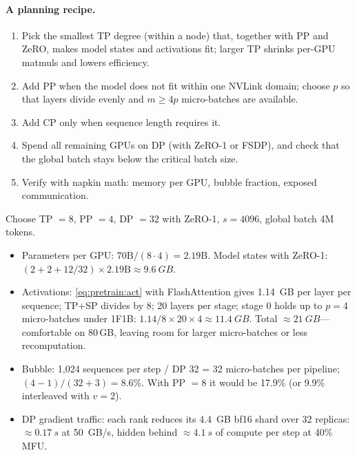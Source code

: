 \paragraph{A planning recipe.}
\begin{enumerate}
\item Pick the smallest TP degree (within a node) that, together with PP and ZeRO, makes model
  states and activations fit; larger TP shrinks per-GPU matmuls and lowers efficiency.
\item Add PP when the model does not fit within one NVLink domain; choose $p$ so that layers
  divide evenly and $m\ge4p$ micro-batches are available.
\item Add CP only when sequence length requires it.
\item Spend all remaining GPUs on DP (with ZeRO-1 or FSDP), and check that the global batch
  stays below the critical batch size.
\item Verify with napkin math: memory per GPU, bubble fraction, exposed communication.
\end{enumerate}

\begin{napkinmath}[A 70B run on 1{,}024 H100s]
Choose TP $=8$, PP $=4$, DP $=32$ with ZeRO-1, $s=4096$, global batch 4M tokens.
\begin{itemize}
\item Parameters per GPU: $70\text{B}/(8\cdot4)=2.19$B. Model states with ZeRO-1:
  $(2+2+12/32)\times2.19\text{B}\approx\SI{9.6}{GB}$.
\item Activations: \cref{eq:pretrain:act} with FlashAttention gives \SI{1.14}{GB} per layer per
  sequence; TP+SP divides by 8; 20 layers per stage; stage 0 holds up to $p=4$ micro-batches
  under 1F1B: $1.14/8\times20\times4\approx\SI{11.4}{GB}$. Total $\approx\SI{21}{GB}$---comfortable on
  80\,GB, leaving room for larger micro-batches or less recomputation.
\item Bubble: 1{,}024 sequences per step / DP 32 = 32 micro-batches per pipeline;
  $(4-1)/(32+3)=8.6\%$. With PP $=8$ it would be 17.9\% (or 9.9\% interleaved with $v=2$).
\item DP gradient traffic: each rank reduces its \SI{4.4}{GB} bf16 shard over 32 replicas:
  $\approx\SI{0.17}{s}$ at \SI{50}{GB/s}, hidden behind $\approx\SI{4.1}{s}$ of compute per step at
  40\% MFU.
\end{itemize}
\end{napkinmath}

